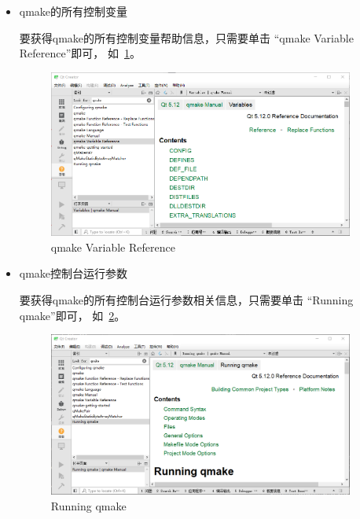 \begin{itemize}

\item qmake的所有控制变量

要获得qmake的所有控制变量帮助信息，只需要单击
“qmake Variable Reference”即可，
如\figurename\ \ref{p000003}。

\begin{figure}[htb] %
\marginnote{\fbox{\footnotesize{\figurename\ \ref{p000003}}}}\centering %
\includegraphics[width=0.95\textwidth]{chapter01/images/qmake_help_1.png} %
\caption{qmake Variable Reference} %
\label{p000003} %
\end{figure}


\item qmake控制台运行参数

要获得qmake的所有控制台运行参数相关信息，只需要单击
“Running qmake”即可，
如\figurename\ \ref{p000004}。
\begin{figure}[htb] %
\marginnote{\fbox{\footnotesize{\figurename\ \ref{p000004}}}}\centering %
\includegraphics[width=0.95\textwidth]{chapter01/images/qmake_help_2.png} %
\caption{Running qmake} %
\label{p000004} %
\end{figure}



\end{itemize}
